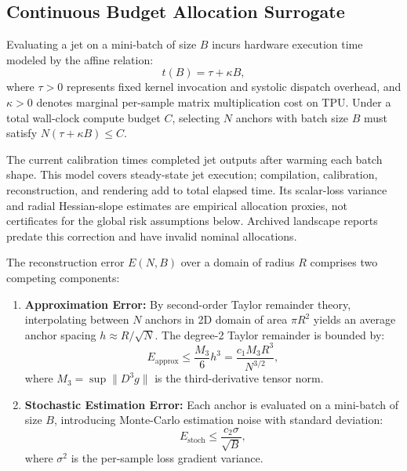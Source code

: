\documentclass[11pt,a4paper]{article}
\theoremstyle{definition}
\theoremstyle{remark}
\begin{document}
\subsection{Continuous Budget Allocation Surrogate}
Evaluating a jet on a mini-batch of size $B$ incurs hardware execution time modeled by the affine relation:
\begin{equation}
    t(B) = \tau + \kappa B,
\end{equation}
where $\tau > 0$ represents fixed kernel invocation and systolic dispatch overhead, and $\kappa > 0$ denotes marginal per-sample matrix multiplication cost on TPU. Under a total wall-clock compute budget $C$, selecting $N$ anchors with batch size $B$ must satisfy $N (\tau + \kappa B) \le C$.

The current calibration times completed jet outputs after warming each batch shape. This model covers steady-state jet execution; compilation, calibration, reconstruction, and rendering add to total elapsed time. Its scalar-loss variance and radial Hessian-slope estimates are empirical allocation proxies, not certificates for the global risk assumptions below. Archived landscape reports predate this correction and have invalid nominal allocations.

The reconstruction error $E(N, B)$ over a domain of radius $R$ comprises two competing components:
\begin{enumerate}
    \item \textbf{Approximation Error:} By second-order Taylor remainder theory, interpolating between $N$ anchors in 2D domain of area $\pi R^2$ yields an average anchor spacing $h \approx R / \sqrt{N}$. The degree-2 Taylor remainder is bounded by:
    \begin{equation}
        E_{\text{approx}} \le \frac{M_3}{6} h^3 = \frac{c_1 M_3 R^3}{N^{3/2}},
    \end{equation}
    where $M_3 = \sup \|D^3 g\|$ is the third-derivative tensor norm.
    \item \textbf{Stochastic Estimation Error:} Each anchor is evaluated on a mini-batch of size $B$, introducing Monte-Carlo estimation noise with standard deviation:
    \begin{equation}
        E_{\text{stoch}} \le \frac{c_2 \sigma}{\sqrt{B}},
    \end{equation}
    where $\sigma^2$ is the per-sample loss gradient variance.
\end{enumerate}
\end{document}
